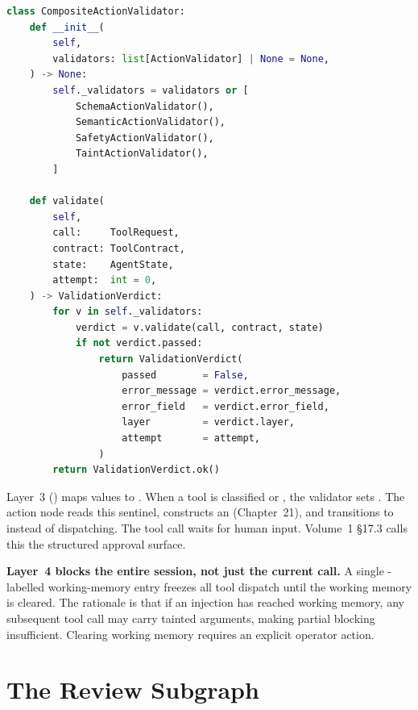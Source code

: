 \begin{lstlisting}[language=Python,
    caption={CompositeActionValidator — chains all four layers (src/validators.py)},
    label={lst:composite-validator}]
class CompositeActionValidator:
    def __init__(
        self,
        validators: list[ActionValidator] | None = None,
    ) -> None:
        self._validators = validators or [
            SchemaActionValidator(),
            SemanticActionValidator(),
            SafetyActionValidator(),
            TaintActionValidator(),
        ]

    def validate(
        self,
        call:     ToolRequest,
        contract: ToolContract,
        state:    AgentState,
        attempt:  int = 0,
    ) -> ValidationVerdict:
        for v in self._validators:
            verdict = v.validate(call, contract, state)
            if not verdict.passed:
                return ValidationVerdict(
                    passed        = False,
                    error_message = verdict.error_message,
                    error_field   = verdict.error_field,
                    layer         = verdict.layer,
                    attempt       = attempt,
                )
        return ValidationVerdict.ok()
\end{lstlisting}

Layer~3 () maps 
values to .  When a tool is classified
 or , the validator sets
.  The action node reads this
sentinel, constructs an  (Chapter~21), and
transitions to  instead of dispatching.
The tool call waits for human input.  Volume~1 §17.3 calls this the
structured approval surface.

\begin{warningbox}
\textbf{Layer~4 blocks the entire session, not just the current call.}
A single -labelled working-memory entry freezes all tool
dispatch until the working memory is cleared.  The rationale is that if
an injection has reached working memory, any subsequent tool call may
carry tainted arguments, making partial blocking insufficient.  Clearing
working memory requires an explicit operator action.
\end{warningbox}

\section{The Review Subgraph}
\label{sec:review-subgraph}

